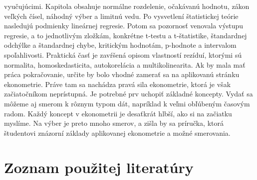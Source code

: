 \documentclass[]{tukediphc}
\begin{document}
vyučujúcimi. Kapitola obsahuje normálne rozdelenie, očakávanú hodnotu, zákon veľkých čísel, náhodný výber a limitnú vedu. Po vysvetlení štatistickej teórie nasledujú podmienky lineárnej regresie. Potom sa pozornosť venovala výstupu regresie, a to jednotlivým zložkám, konkrétne t-testu a t-štatistike, štandardnej odchýlke a štandardnej chybe, kritickým hodnotám, p-hodnote a intervalom spoľahlivosti. Praktická časť je zavŕšená opisom vlastností rezíduí, ktorými sú normalita, homoskedasticita, autokorelácia a multikolinearita. Ak by mala mať práca pokračovanie, určite by bolo vhodné zamerať sa na aplikovanú stránku ekonometrie. Práve tam sa nachádza pravá sila ekonometrie, ktorá je však začiatočníkom neprístupná. Je potrebné prv uchopiť základné koncepty. Vydať sa môžeme aj smerom k rôznym typom dát, napríklad k veľmi obľúbeným časovým radom. Každý koncept v ekonometrii je desaťkrát hlbší, ako si na začiatku myslíme. Na výber je preto mnoho smerov, a zišla by sa príručka, ktorá študentovi znázorní základy aplikovanej ekonometrie a možné smerovania.


\newpage
{}
\section*{Zoznam použitej literatúry}




%

%

%


\newpage
{}
\protect\label{page:posledna}
\end{document}
